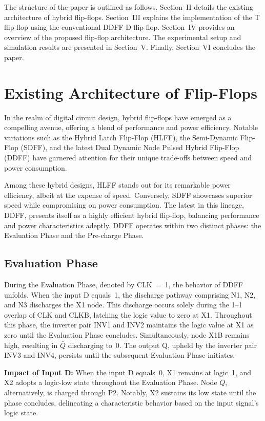 \documentclass[conference]{IEEEtran}
\begin{document}
The structure of the paper is outlined as follows. Section~II details the existing architecture of hybrid flip-flops. Section~III explains the implementation of the T flip-flop using the conventional DDFF D flip-flop. Section~IV provides an overview of the proposed flip-flop architecture. The experimental setup and simulation results are presented in Section~V. Finally, Section~VI concludes the paper.

\section{Existing Architecture of Flip-Flops}

In the realm of digital circuit design, hybrid flip-flops have emerged as a compelling avenue, offering a blend of performance and power efficiency. Notable variations such as the Hybrid Latch Flip-Flop (HLFF), the Semi-Dynamic Flip-Flop (SDFF), and the latest Dual Dynamic Node Pulsed Hybrid Flip-Flop (DDFF) have garnered attention for their unique trade-offs between speed and power consumption.

Among these hybrid designs, HLFF stands out for its remarkable power efficiency, albeit at the expense of speed. Conversely, SDFF showcases superior speed while compromising on power consumption. The latest in this lineage, DDFF, presents itself as a highly efficient hybrid flip-flop, balancing performance and power characteristics adeptly. DDFF operates within two distinct phases: the Evaluation Phase and the Pre-charge Phase.

\subsection{Evaluation Phase}

During the Evaluation Phase, denoted by CLK~=~1, the behavior of DDFF unfolds. When the input D equals~1, the discharge pathway comprising N1, N2, and N3 discharges the X1 node. This discharge occurs solely during the 1--1 overlap of CLK and CLKB, latching the logic value to zero at X1. Throughout this phase, the inverter pair INV1 and INV2 maintains the logic value at X1 as zero until the Evaluation Phase concludes. Simultaneously, node X1B remains high, resulting in $\bar{Q}$ discharging to~0. The output Q, upheld by the inverter pair INV3 and INV4, persists until the subsequent Evaluation Phase initiates.

\textbf{Impact of Input D:} When the input D equals~0, X1 remains at logic~1, and X2 adopts a logic-low state throughout the Evaluation Phase. Node $\bar{Q}$, alternatively, is charged through P2. Notably, X2 sustains its low state until the phase concludes, delineating a characteristic behavior based on the input signal's logic state.
\end{document}
